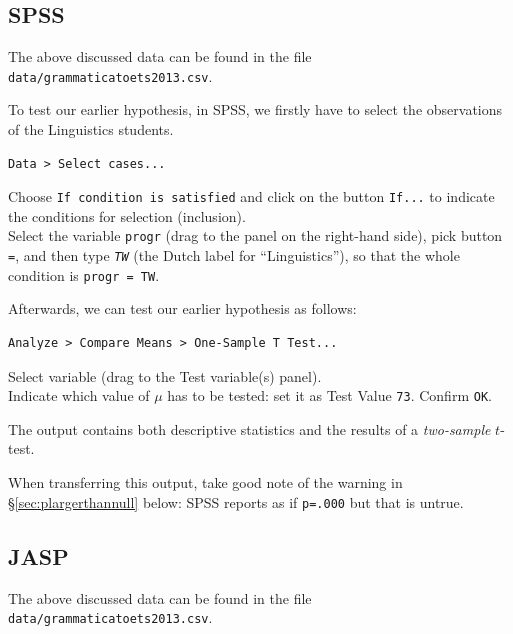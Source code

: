 \documentclass[
]{book}
\begin{document}
\hypertarget{spss-10}{%
\subsection{SPSS}\label{spss-10}}

The above discussed data can be found in the file \texttt{data/grammaticatoets2013.csv}.

To test our earlier hypothesis, in SPSS, we firstly have
to select the observations of the Linguistics students.

\begin{verbatim}
Data > Select cases...
\end{verbatim}

Choose \texttt{If\ condition\ is\ satisfied} and click on the button \texttt{If...} to indicate
the conditions for selection (inclusion).~\\
Select the variable \texttt{progr} (drag to the panel on the right-hand side), pick
button \texttt{=}, and then type \emph{\texttt{TW}} (the Dutch label for ``Linguistics''), so that the whole condition is
\texttt{progr\ =\ TW}.

Afterwards, we can test our earlier hypothesis as follows:

\begin{verbatim}
Analyze > Compare Means > One-Sample T Test...
\end{verbatim}

Select variable (drag to the Test variable(s) panel).\\
Indicate which value of \(\mu\) has to be tested: set it as
Test Value \texttt{73}. Confirm \texttt{OK}.

The output contains both descriptive statistics and the results
of a \emph{two-sample} \(t\)-test.

When transferring this output, take good note of the warning in
§\ref{sec:plargerthannull} below: SPSS reports as if \texttt{p=.000} but that is untrue.

\hypertarget{sec:jaspttestonesample}{%
\subsection{JASP}\label{sec:jaspttestonesample}}

The above discussed data can be found in the file \texttt{data/grammaticatoets2013.csv}.
\end{document}
